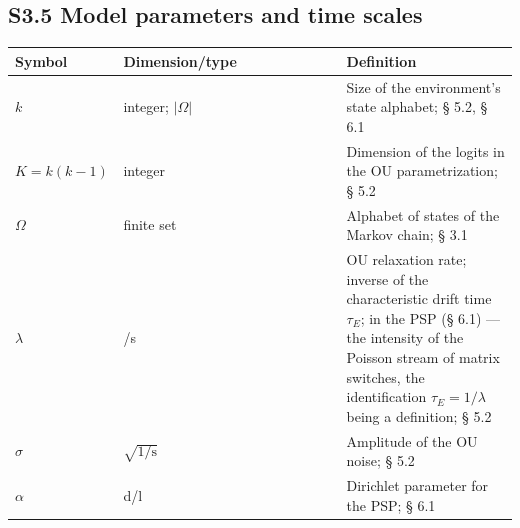 \documentclass[pdflatex,sn-mathphys-ay]{sn-jnl}
\begin{document}
\subsection*{S3.5 Model parameters and time scales}\label{s3.5-model-parameters-and-time-scales}



\begin{center}\small
\begin{tabular}{@{} >{\raggedright\arraybackslash}p{0.2105\linewidth} >{\raggedright\arraybackslash}p{0.4474\linewidth} >{\raggedright\arraybackslash}p{0.3421\linewidth}@{}}
\toprule

\begin{minipage}[b]{\linewidth}\raggedright

Symbol

\end{minipage} & \begin{minipage}[b]{\linewidth}\raggedright

Dimension/type

\end{minipage} & \begin{minipage}[b]{\linewidth}\raggedright

Definition

\end{minipage} \\

\midrule

\(k\) & integer; \(\lvert\Omega\rvert\) & Size of the environment's state alphabet; § 5.2, § 6.1 \\

\(K = k(k-1)\) & integer & Dimension of the logits in the OU parametrization; § 5.2 \\

\(\Omega\) & finite set & Alphabet of states of the Markov chain; § 3.1 \\

\(\lambda\) & 1/s & OU relaxation rate; inverse of the characteristic drift time \(\tau_E\); in the PSP (§ 6.1) --- the intensity of the Poisson stream of matrix switches, the identification \(\tau_E = 1/\lambda\) being a definition; § 5.2 \\

\(\sigma\) & \(\sqrt{1/\text{s}}\) & Amplitude of the OU noise; § 5.2 \\

\(\alpha\) & d/l & Dirichlet parameter for the PSP; § 6.1 \\


\end{tabular}
\end{center}
\end{document}
